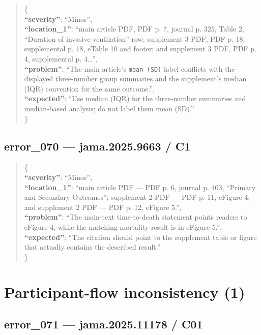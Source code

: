 \documentclass[
  letterpaper,
  9pt]{extreport}
\begin{document}
\begin{quote}
\{\\
\textbf{``severity''}: ``Minor'',\\
\textbf{``location\_1''}: ``main article PDF, PDF p. 7, journal p. 325,
Table 2, ``Duration of invasive ventilation'' row; supplement 3 PDF, PDF
p. 18, supplemental p. 18, eTable 10 and footer; and supplement 3 PDF,
PDF p. 4, supplemental p. 4\ldots{}'',\\
\textbf{``problem''}: ``The main article's \texttt{mean\ (SD)} label
conflicts with the displayed three-number group summaries and the
supplement's median (IQR) convention for the same outcome.'',\\
\textbf{``expected''}: ``Use median (IQR) for the three-number summaries
and median-based analysis; do not label them mean (SD).''\\
\}
\end{quote}

\hypertarget{error_070--jama20259663--c1}{%
\subsection{error\_070 --- jama.2025.9663 /
C1}\label{error_070--jama20259663--c1}}

\begin{quote}
\{\\
\textbf{``severity''}: ``Minor'',\\
\textbf{``location\_1''}: ``main article PDF --- PDF p. 6, journal p.
403, ``Primary and Secondary Outcomes''; supplement 2 PDF --- PDF p. 11,
eFigure 4; and supplement 2 PDF --- PDF p. 12, eFigure 5.'',\\
\textbf{``problem''}: ``The main-text time-to-death statement points
readers to eFigure 4, while the matching mortality result is in eFigure
5.'',\\
\textbf{``expected''}: ``The citation should point to the supplement
table or figure that actually contains the described result.''\\
\}
\end{quote}

\hypertarget{participant-flow-inconsistency-1}{%
\section{Participant-flow inconsistency
(1)}\label{participant-flow-inconsistency-1}}

\hypertarget{error_071--jama202511178--c01}{%
\subsection{error\_071 --- jama.2025.11178 /
C01}\label{error_071--jama202511178--c01}}
\end{document}
